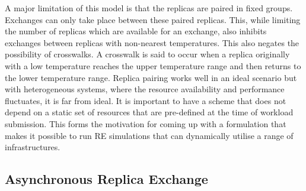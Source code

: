 \documentclass{rspublic}
\newcommand{\jhanote}[1]{ {\textcolor{red} { ***shantenu: #1 }}}
\newcommand{\jhanote}[1]{}
\begin{document}
 
A major limitation of this model is that the replicas are paired in
fixed groups.  Exchanges can only take place between these paired
replicas.  This, while limiting the number of replicas which are
available for an exchange, also inhibits exchanges between replicas
with non-nearest temperatures. This also negates the possibility of
crosswalks. A crosswalk is said to occur when a replica originally
with a low temperature reaches the upper temperature range and then
returns to the lower temperature
range. %
Replica pairing works well in an ideal scenario but with heterogeneous
systems, where the resource availability and performance fluctuates,
it is far from ideal. It is important to have a scheme that does not
depend on a static  set of
resources that are pre-defined at the time of workload submission.
This forms the motivation for coming up with a formulation that makes
it possible to run RE simulations that can dynamically utilise a range
of infrastructures.



  
\subsection{Asynchronous Replica Exchange}

\end{document}

